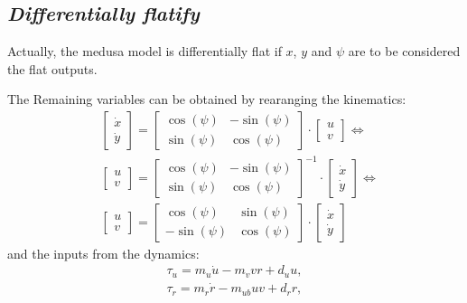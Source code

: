 \subsection{\textit{Differentially flatify}}

\par Actually, the medusa model is differentially flat if $x$, $y$ and $\psi$ are to be considered the flat outputs.

The Remaining variables can be obtained by rearanging the kinematics:
\begin{equation}
\begin{split}
    & \begin{bmatrix}
        \dot{x} \\ \dot{y}
    \end{bmatrix} = 
    \begin{bmatrix}
        \cos(\psi) & - \sin(\psi) \\
        \sin(\psi) & \cos(\psi)
    \end{bmatrix} \cdot
    \begin{bmatrix}
        u \\ v
    \end{bmatrix} \Leftrightarrow  \\
    & \begin{bmatrix}
        u \\ v
    \end{bmatrix} = 
    \begin{bmatrix}
        \cos(\psi) & - \sin(\psi) \\
        \sin(\psi) & \cos(\psi)
    \end{bmatrix}^{-1} \cdot
    \begin{bmatrix}
        \dot{x} \\ \dot{y}
    \end{bmatrix} \Leftrightarrow \\
    & \begin{bmatrix}
        u \\ v
    \end{bmatrix} = 
    \begin{bmatrix}
        \cos(\psi) & \sin(\psi) \\
        - \sin(\psi) & \cos(\psi)
    \end{bmatrix} \cdot
    \begin{bmatrix}
        \dot{x} \\ \dot{y}
    \end{bmatrix}
\end{split}
\end{equation}
and the  inputs from the dynamics:
\begin{equation} 
    \begin{gathered}
        \tau_u = m_u\dot{u} - m_v v r + d_u u , \\
        \tau_r = m_r \dot{r} - m_{ub} u v + d_r r ,
    \end{gathered}
    \label{eq:rearaged_dynamics}
\end{equation}
 
